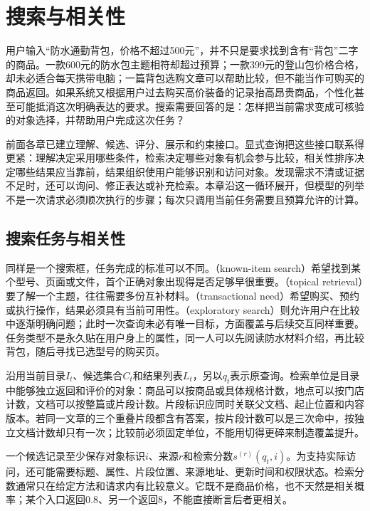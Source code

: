 \chapter{搜索与相关性}
\label{chap:rs-search}

用户输入“防水通勤背包，价格不超过500元”，并不只是要求找到含有“背包”二字的商品。一款600元的防水包主题相符却超过预算；一款399元的登山包价格合格，却未必适合每天携带电脑；一篇背包选购文章可以帮助比较，但不能当作可购买的商品返回。如果系统又根据用户过去购买高价装备的记录抬高昂贵商品，个性化甚至可能抵消这次明确表达的要求。搜索需要回答的是：怎样把当前需求变成可核验的对象选择，并帮助用户完成这次任务？

前面各章已建立理解、候选、评分、展示和约束接口。显式查询把这些接口联系得更紧：理解决定采用哪些条件，检索决定哪些对象有机会参与比较，相关性排序决定哪些结果应当靠前，结果组织使用户能够识别和访问对象。发现需求不清或证据不足时，还可以询问、修正表达或补充检索。本章沿这一循环展开，但模型的列举不是一次请求必须顺次执行的步骤；每次只调用当前任务需要且预算允许的计算。

\section{搜索任务与相关性}
\label{sec:rs-search-task}

同样是一个搜索框，任务完成的标准可以不同。（known-item search）希望找到某个型号、页面或文件，首个正确对象出现得是否足够早很重要。（topical retrieval）要了解一个主题，往往需要多份互补材料。（transactional need）希望购买、预约或执行操作，结果必须具有当前可用性。（exploratory search）则允许用户在比较中逐渐明确问题；此时一次查询未必有唯一目标，方面覆盖与后续交互同样重要。任务类型不是永久贴在用户身上的属性，同一人可以先阅读防水材料介绍，再比较背包，随后寻找已选型号的购买页。

沿用当前目录$I_t$、候选集合$C_t$和结果列表$L_t$，另以$q_t$表示原查询。检索单位是目录中能够独立返回和评价的对象：商品可以按商品或具体规格计数，地点可以按门店计数，文档可以按整篇或片段计数。片段标识应同时关联父文档、起止位置和内容版本。若同一文章的三个重叠片段都含有答案，按片段计数可以是三次命中，按独立文档计数却只有一次；比较前必须固定单位，不能用切得更碎来制造覆盖提升。

一个候选记录至少保存对象标识$i$、来源$r$和检索分数$s^{(r)}(q_t,i)$。为支持实际访问，还可能需要标题、属性、片段位置、来源地址、更新时间和权限状态。检索分数通常只在给定方法和请求内有比较意义。它既不是商品价格，也不天然是相关概率；某个入口返回0.8、另一个返回8，不能直接断言后者更相关。

